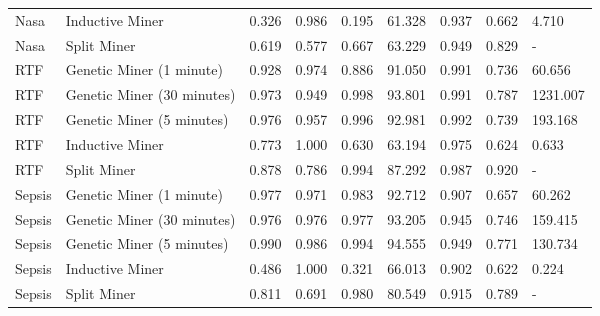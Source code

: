 \begin{tabular}{llrrrrrrl}
Nasa & Inductive Miner & 0.326 & 0.986 & 0.195 & 61.328 & 0.937 & 0.662 & 4.710 \\
Nasa & Split Miner & 0.619 & 0.577 & 0.667 & 63.229 & 0.949 & 0.829 & - \\
RTF & Genetic Miner (1 minute) & 0.928 & 0.974 & 0.886 & 91.050 & 0.991 & 0.736 & 60.656 \\
RTF & Genetic Miner (30 minutes) & 0.973 & 0.949 & 0.998 & 93.801 & 0.991 & 0.787 & 1231.007 \\
RTF & Genetic Miner (5 minutes) & 0.976 & 0.957 & 0.996 & 92.981 & 0.992 & 0.739 & 193.168 \\
RTF & Inductive Miner & 0.773 & 1.000 & 0.630 & 63.194 & 0.975 & 0.624 & 0.633 \\
RTF & Split Miner & 0.878 & 0.786 & 0.994 & 87.292 & 0.987 & 0.920 & - \\
Sepsis & Genetic Miner (1 minute) & 0.977 & 0.971 & 0.983 & 92.712 & 0.907 & 0.657 & 60.262 \\
Sepsis & Genetic Miner (30 minutes) & 0.976 & 0.976 & 0.977 & 93.205 & 0.945 & 0.746 & 159.415 \\
Sepsis & Genetic Miner (5 minutes) & 0.990 & 0.986 & 0.994 & 94.555 & 0.949 & 0.771 & 130.734 \\
Sepsis & Inductive Miner & 0.486 & 1.000 & 0.321 & 66.013 & 0.902 & 0.622 & 0.224 \\
Sepsis & Split Miner & 0.811 & 0.691 & 0.980 & 80.549 & 0.915 & 0.789 & - \\
\bottomrule
\end{tabular}
